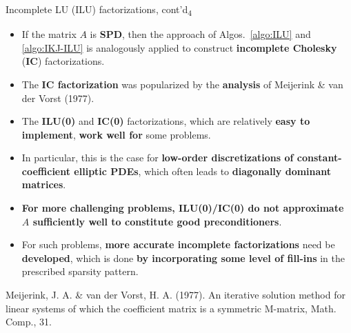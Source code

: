 \documentclass[t,usepdftitle=false]{beamer}
\begin{document}
\begin{frame}{Incomplete LU (ILU) factorizations, cont'd\textsubscript{4}}
\begin{itemize}\item If the matrix $A$ is \textbf{SPD}, then the approach of Algos.~\ref{algo:ILU} and \ref{algo:IKJ-ILU} is analogously applied to construct \textbf{incomplete Cholesky} (\textbf{IC}) factorizations.
\item[] The \textbf{IC factorization} was popularized by the \textbf{analysis} of Meijerink \& van der Vorst (1977).
\item The \textbf{ILU(0)} and \textbf{IC(0)} factorizations, which are relatively \textbf{easy to implement}, \textbf{work well for} some problems.
\item[] In particular, this is the case for \textbf{low-order discretizations of constant-coefficient elliptic PDEs}, which often leads to \textbf{diagonally dominant matrices}.
\item \textbf{For more challenging problems, ILU(0)/IC(0) do not approximate $A$ sufficiently well to constitute good preconditioners}.
\item[] For such problems, \textbf{more accurate incomplete factorizations} need be \textbf{developed}, which is done \textbf{by incorporating some level of fill-ins} in the prescribed sparsity pattern.
\end{itemize}\smallskip
\tiny{Meijerink, J. A. \& van der Vorst, H. A. (1977). An iterative solution method for linear systems of which the coefficient matrix is a symmetric M-matrix, Math. Comp., 31.}
\end{frame}
\end{document}
